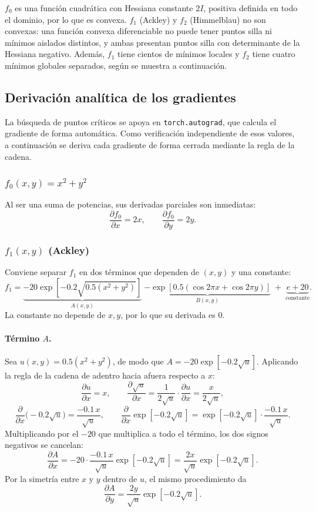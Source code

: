 $f_0$ es una función cuadrática con Hessiana constante $2I$, positiva
definida en todo el dominio, por lo que es convexa. $f_1$ (Ackley) y $f_2$
(Himmelblau) no son convexas: una función convexa diferenciable no puede
tener puntos silla ni mínimos aislados distintos, y ambas presentan puntos
silla con determinante de la Hessiana negativo. Además, $f_1$ tiene cientos
de mínimos locales y $f_2$ tiene cuatro mínimos globales separados, según se
muestra a continuación.

\subsection{Derivación analítica de los gradientes}
\label{sec:gradientes_analiticos}

La búsqueda de puntos críticos se apoya en \texttt{torch.autograd}, que
calcula el gradiente de forma automática. Como verificación independiente
de esos valores, a continuación se deriva cada gradiente de forma cerrada
mediante la regla de la cadena.

\subsubsection{\texorpdfstring{$f_0(x,y)=x^2+y^2$}{f0(x, y) = x² + y²}}
Al ser una suma de potencias, sus derivadas parciales son inmediatas:
\[
\frac{\partial f_0}{\partial x} = 2x, \qquad \frac{\partial f_0}{\partial y} = 2y.
\]

\subsubsection{\texorpdfstring{$f_1(x,y)$}{f1(x, y)} (Ackley)}

Conviene separar $f_1$ en dos términos que dependen de $(x,y)$ y una
constante:
\[
f_1 = \underbrace{-20\exp\!\left[-0.2\sqrt{0.5(x^2+y^2)}\right]}_{A(x,y)}
\;\underbrace{-\exp\!\left[0.5(\cos 2\pi x+\cos2\pi y)\right]}_{B(x,y)}
\;+\;\underbrace{e+20}_{\text{constante}}.
\]
La constante no depende de $x,y$, por lo que su derivada es $0$.

\paragraph{Término $A$.} Sea $u(x,y)=0.5(x^2+y^2)$, de modo que
$A=-20\exp[-0.2\sqrt{u}]$. Aplicando la regla de la cadena de adentro
hacia afuera respecto a $x$:
\[
\frac{\partial u}{\partial x} = x,
\qquad
\frac{\partial \sqrt{u}}{\partial x} = \frac{1}{2\sqrt{u}}\cdot\frac{\partial u}{\partial x} = \frac{x}{2\sqrt{u}},
\]
\[
\frac{\partial}{\partial x}\big(-0.2\sqrt{u}\big) = \frac{-0.1\,x}{\sqrt{u}},
\qquad
\frac{\partial}{\partial x}\exp\!\left[-0.2\sqrt{u}\right] = \exp\!\left[-0.2\sqrt{u}\right]\cdot\frac{-0.1\,x}{\sqrt{u}}.
\]
Multiplicando por el $-20$ que multiplica a todo el término, los dos
signos negativos se cancelan:
\[
\frac{\partial A}{\partial x} = -20\cdot\frac{-0.1\,x}{\sqrt{u}}\exp\!\left[-0.2\sqrt{u}\right]
= \frac{2x}{\sqrt{u}}\exp\!\left[-0.2\sqrt{u}\right].
\]
Por la simetría entre $x$ y $y$ dentro de $u$, el mismo procedimiento da
\[
\frac{\partial A}{\partial y} = \frac{2y}{\sqrt{u}}\exp\!\left[-0.2\sqrt{u}\right].
\]

